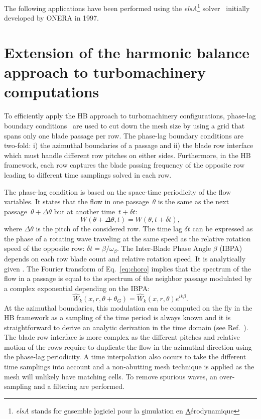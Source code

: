 
The following applications have been performed using the
\emph{elsA}\footnote{\emph{elsA} stands for \underline{e}nsemble 
\underline{l}ogiciel pour la \underline{s}imulation en 
\underline{A}\'erodynamique} solver~\cite{Cambier2013} initially developed by ONERA in 1997.


\section{Extension of the harmonic balance approach to
  turbomachinery computations}
\label{sec:turbomachinery_adaptation}

To efficiently apply the HB approach to turbomachinery
configurations, phase-lag boundary conditions~\cite{Erdos1977} are
used to cut down the mesh size by using a grid that spans only one
blade passage per row. The phase-lag boundary conditions are two-fold:
i) the azimuthal boundaries of a passage and ii) the blade row
interface which must handle different row pitches on either
sides. Furthermore, in the HB framework, each row captures the blade
passing frequency of the opposite row leading to different time
samplings solved in each row.

The phase-lag condition is based on the space-time periodicity of the
flow variables. It states that the flow in one passage~$\theta$ is the
same as the next passage~$\theta+\Delta\theta$ but at another
time~$t+\delta t$:
\begin{equation}
  W\left(\theta+\Delta\theta,t \right) = W\left(\theta,t+\delta t \right),
  \label{eq:choro}
\end{equation}
where $\Delta \theta$ is the pitch of the considered row.  The time
lag $\delta t$ can be expressed as the phase of a rotating wave
traveling at the same speed as the relative rotation speed of the
opposite row: $\delta t=\beta/\omega_\beta$.  The Inter-Blade Phase
Angle $\beta$ (IBPA) depends on each row blade count and relative
rotation speed. It is analytically given \citet{Gerolymos1991}.  The Fourier
transform of Eq.~\eqref{eq:choro} implies that the spectrum of the
flow in a passage is equal to the spectrum of the neighbor passage
modulated by a complex exponential depending on the IBPA:
\begin{equation*}
  \widehat{W}_k(x, r,  \theta+\theta_G)  = {\widehat{W}_k(x, r,
    \theta)e^{i k\beta}}.
\end{equation*}
At the azimuthal boundaries, this modulation can be computed on the fly
in the HB framework as a sampling of the time period is always known
and it is straightforward to derive an analytic derivation in the time
domain (see Ref.~\cite{JSicot2012}). The blade row interface is more complex
as the different pitches and relative motion of the rows require to
duplicate the flow in the azimuthal direction using the phase-lag
periodicity. A time interpolation also occurs to take the
different time samplings into account and a non-abutting mesh
technique is applied as the mesh will unlikely have matching
cells. To remove spurious waves, an over-sampling and a filtering are
performed. 

